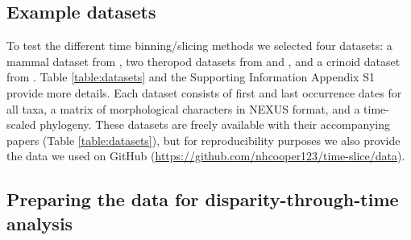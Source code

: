 \documentclass[12pt,a4paper]{article}
\begin{document}
\subsection{Example datasets}
\label{datasets}
To test the different time binning/slicing methods we selected four datasets: a mammal dataset from \cite{beckancient2014}, two theropod datasets from \cite{brusatte2014gradual} and \cite{bapst2016topology}, and a crinoid dataset from \cite{wright2017bayesian}.
Table \ref{table:datasets} and the Supporting Information Appendix S1 provide more details. 
Each dataset consists of first and last occurrence dates for all taxa, a matrix of morphological characters in NEXUS format, and a time-scaled phylogeny. 
These datasets are freely available with their accompanying papers (Table \ref{table:datasets}), but for reproducibility purposes we also provide the data we used on GitHub (\url{https://github.com/nhcooper123/time-slice/data}).

\begin{landscape}
   
  \label{table:datasets}  
\end{landscape}

\subsection{Preparing the data for disparity-through-time analysis}
\end{document}
